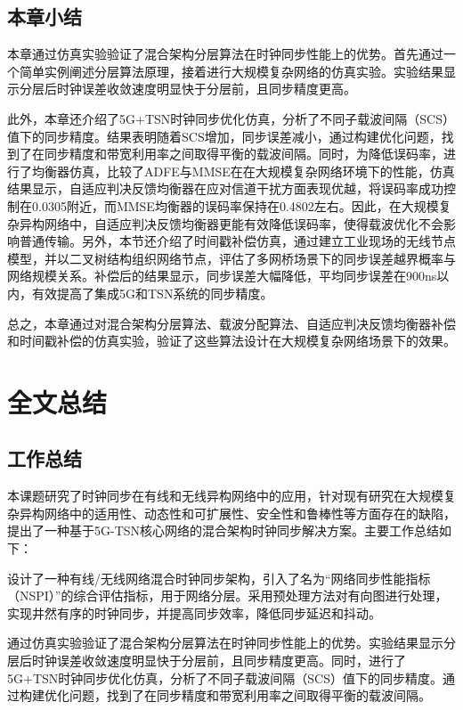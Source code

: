 \documentclass[UTF8,a4paper,12pt]{ctexart}
\numberwithin{equation}{section}
\begin{document}
\subsection{本章小结}
本章通过仿真实验验证了混合架构分层算法在时钟同步性能上的优势。首先通过一个简单实例阐述分层算法原理，接着进行大规模复杂网络的仿真实验。实验结果显示分层后时钟误差收敛速度明显快于分层前，且同步精度更高。

此外，本章还介绍了5G+TSN时钟同步优化仿真，分析了不同子载波间隔（SCS）值下的同步精度。结果表明随着SCS增加，同步误差减小，通过构建优化问题，找到了在同步精度和带宽利用率之间取得平衡的载波间隔。同时，为降低误码率，进行了均衡器仿真，比较了ADFE与MMSE在在大规模复杂网络环境下的性能，仿真结果显示，自适应判决反馈均衡器在应对信道干扰方面表现优越，将误码率成功控制在0.0305附近，而MMSE均衡器的误码率保持在0.4802左右。因此，在大规模复杂异构网络中，自适应判决反馈均衡器更能有效降低误码率，使得载波优化不会影响普通传输。另外，本节还介绍了时间戳补偿仿真，通过建立工业现场的无线节点模型，并以二叉树结构组织网络节点，评估了多网桥场景下的同步误差越界概率与网络规模关系。补偿后的结果显示，同步误差大幅降低，平均同步误差在900ns以内，有效提高了集成5G和TSN系统的同步精度。

总之，本章通过对混合架构分层算法、载波分配算法、自适应判决反馈均衡器补偿和时间戳补偿的仿真实验，验证了这些算法设计在大规模复杂网络场景下的效果。


\newpage
{}
\section{全文总结}

\subsection{工作总结}
本课题研究了时钟同步在有线和无线异构网络中的应用，针对现有研究在大规模复杂异构网络中的适用性、动态性和可扩展性、安全性和鲁棒性等方面存在的缺陷，提出了一种基于5G-TSN核心网络的混合架构时钟同步解决方案。主要工作总结如下：

设计了一种有线/无线网络混合时钟同步架构，引入了名为“网络同步性能指标（NSPI）”的综合评估指标，用于网络分层。采用预处理方法对有向图进行处理，实现井然有序的时钟同步，并提高同步效率，降低同步延迟和抖动。

通过仿真实验验证了混合架构分层算法在时钟同步性能上的优势。实验结果显示分层后时钟误差收敛速度明显快于分层前，且同步精度更高。同时，进行了5G+TSN时钟同步优化仿真，分析了不同子载波间隔（SCS）值下的同步精度。通过构建优化问题，找到了在同步精度和带宽利用率之间取得平衡的载波间隔。
\end{document}
